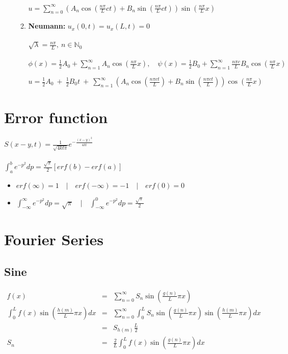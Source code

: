 \documentclass[12pt]{article}
\newcommand\bitalicmath{\mathversion{bitalic}}
\begin{document}
\begin{enumerate}
\begin{enumerate}
		$u =  \displaystyle\sum\limits_{n = 0}^{\infty} \left(A_n \cos(\frac{n\pi}{L}ct) + B_n\sin(\frac{n\pi}{L}ct)\right)\sin(\frac{n\pi}{L}x)$ \\
		\item {\bf Neumann: }{\bitalicmath $ u_x(0,t) = u_x(L,t) = 0$} \\ \\
		$\sqrt{\lambda} = \displaystyle \frac{n\pi}{L},\ n \in \mathbb{N}_0$ \\ \\
		$\phi(x) = \frac{1}{2}A_0 + \sum\limits_{n = 1}^{\infty} A_n\cos(\frac{n\pi}{L}x),\quad \psi(x) = \frac{1}{2}B_0 + \sum\limits_{n = 1}^{\infty} \frac{n\pi c}{L} B_n\cos(\frac{n\pi}{L}x)$
	
		$u =  \displaystyle\frac{1}{2}A_0\  +\  \frac{1}{2}B_0 t\  +\  \sum\limits_{n = 1}^{\infty} \left(A_n \cos(\frac{n\pi ct}{L}) + B_n\sin(\frac{n\pi ct}{L})\right)\cos(\frac{n\pi}{L}x)$ \\	
		\end{enumerate}
	\end{enumerate}

\section{Error function}
$S(x-y,t) = \frac{1}{\sqrt{4kt\pi}}e^{-\frac{(x-y)^2}{4kt}}$ \\ \\
$\int_{a}^{b} e^{-p^2}dp = \displaystyle\frac{\sqrt{\pi}}{2}[erf(b) - erf(a)]$
	\begin{itemize}
	\item $erf(\infty) = 1 \quad|\quad erf(-\infty) = -1 \quad|\quad erf(0) = 0$
	\item $\int_{-\infty}^{\infty} e^{-p^2}dp = \sqrt{\pi} \quad|\quad \int_{-\infty}^{0} e^{-p^2}dp = \displaystyle\frac{\sqrt{\pi}}{2}$ \\
	\end{itemize}

\section{Fourier Series}
\subsection{Sine}
	\begin{eqnarray*}
	 f(x) &=& \displaystyle\sum\limits_{n = 0}^{\infty} S_n \sin\left(\frac{g(n)}{L}\pi x \right) \\
	 \displaystyle \int_{0}^{L} f(x)\sin\left(\frac{h(m)}{L}\pi x\right) dx &=& \sum\limits_{n = 0}^{\infty} \int_{0}^{L} S_n \sin\left(\frac{g(n)}{L}\pi x \right) \sin\left(\frac{h(m)}{L}\pi x\right) dx \\
	&=& S_{h(m)} \frac{L}{2} \\
	S_n &=&  \displaystyle \frac{2}{L} \int_{0}^{L} f(x)\sin\left(\frac{g(n)}{L}\pi x\right) dx
	\end{eqnarray*}
\end{document}
